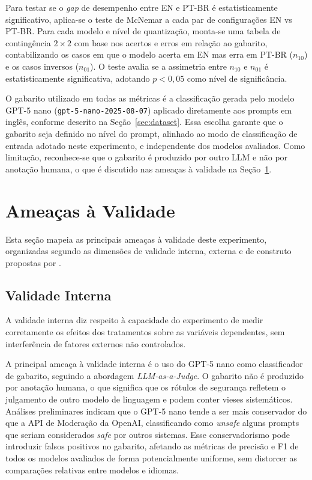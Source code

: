 Para testar se o \textit{gap} de desempenho entre EN e PT-BR é estatisticamente significativo, aplica-se o teste de McNemar \cite{mcnemar1947} a cada par de configurações EN vs PT-BR. Para cada modelo e nível de quantização, monta-se uma tabela de contingência $2 \times 2$ com base nos acertos e erros em relação ao gabarito, contabilizando os casos em que o modelo acerta em EN mas erra em PT-BR ($n_{10}$) e os casos inversos ($n_{01}$). O teste avalia se a assimetria entre $n_{10}$ e $n_{01}$ é estatisticamente significativa, adotando $p < 0{,}05$ como nível de significância.

O gabarito utilizado em todas as métricas é a classificação gerada pelo modelo GPT-5 nano (\texttt{gpt-5-nano-2025-08-07}) aplicado diretamente aos prompts em inglês, conforme descrito na Seção~\ref{sec:dataset}. Essa escolha garante que o gabarito seja definido no nível do prompt, alinhado ao modo de classificação de entrada adotado neste experimento, e independente dos modelos avaliados. Como limitação, reconhece-se que o gabarito é produzido por outro LLM e não por anotação humana, o que é discutido nas ameaças à validade na Seção~\ref{sec:ameacas}.

\section{Ameaças à Validade}
\label{sec:ameacas}

Esta seção mapeia as principais ameaças à validade deste experimento, organizadas segundo as dimensões de validade interna, externa e de construto propostas por .

\subsection{Validade Interna}
\label{sec:ameacas-interna}

A validade interna diz respeito à capacidade do experimento de medir corretamente os efeitos dos tratamentos sobre as variáveis dependentes, sem interferência de fatores externos não controlados.

A principal ameaça à validade interna é o uso do GPT-5 nano como classificador de gabarito, seguindo a abordagem \textit{LLM-as-a-Judge}. O gabarito não é produzido por anotação humana, o que significa que os rótulos de segurança refletem o julgamento de outro modelo de linguagem e podem conter vieses sistemáticos. Análises preliminares indicam que o GPT-5 nano tende a ser mais conservador do que a API de Moderação da OpenAI, classificando como \textit{unsafe} alguns prompts que seriam considerados \textit{safe} por outros sistemas. Esse conservadorismo pode introduzir falsos positivos no gabarito, afetando as métricas de precisão e F1 de todos os modelos avaliados de forma potencialmente uniforme, sem distorcer as comparações relativas entre modelos e idiomas.

